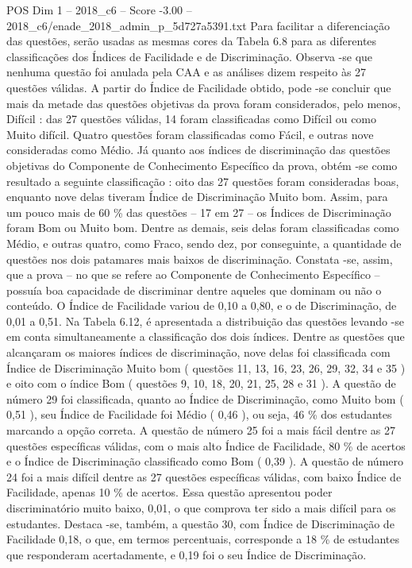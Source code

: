 \begin{textsample}{POS Dim 1 – 2018\_c6 – Score -3.00 – 2018\_c6/enade\_2018\_admin\_p\_5d727a5391.txt}
Para facilitar a diferenciação das questões, serão usadas as mesmas cores da Tabela 6.8 para as diferentes classificações dos Índices de Facilidade e de Discriminação.
Observa -se que nenhuma questão foi anulada pela CAA e as análises dizem respeito às 27 questões válidas.
A partir do Índice de Facilidade obtido, pode -se concluir que mais da metade das questões objetivas da prova foram considerados, pelo menos, Difícil : das 27 questões válidas, 14 foram classificadas como Difícil ou como Muito difícil.
Quatro questões foram classificadas como Fácil, e outras nove consideradas como Médio.
Já quanto aos índices de discriminação das questões objetivas do Componente de Conhecimento Específico da prova, obtém -se como resultado a seguinte classificação : oito das 27 questões foram consideradas boas, enquanto nove delas tiveram Índice de Discriminação Muito bom.
Assim, para um pouco mais de 60 \% das questões – 17 em 27 – os Índices de Discriminação foram Bom ou Muito bom.
Dentre as demais, seis delas foram classificadas como Médio, e outras quatro, como Fraco, sendo dez, por conseguinte, a quantidade de questões nos dois patamares mais baixos de discriminação.
Constata -se, assim, que a prova – no que se refere ao Componente de Conhecimento Específico – possuía boa capacidade de discriminar dentre aqueles que dominam ou não o conteúdo.
O Índice de Facilidade variou de 0,10 a 0,80, e o de Discriminação, de 0,01 a 0,51.
Na Tabela 6.12, é apresentada a distribuição das questões levando -se em conta simultaneamente a classificação dos dois índices.
Dentre as questões que alcançaram os maiores índices de discriminação, nove delas foi classificada com Índice de Discriminação Muito bom ( questões 11, 13, 16, 23, 26, 29, 32, 34 e 35 ) e oito com o índice Bom ( questões 9, 10, 18, 20, 21, 25, 28 e 31 ).
A questão de número 29 foi classificada, quanto ao Índice de Discriminação, como Muito bom ( 0,51 ), seu Índice de Facilidade foi Médio ( 0,46 ), ou seja, 46 \% dos estudantes marcando a opção correta.
A questão de número 25 foi a mais fácil dentre as 27 questões específicas válidas, com o mais alto Índice de Facilidade, 80 \% de acertos e o Índice de Discriminação classificado como Bom ( 0,39 ).
A questão de número 24 foi a mais difícil dentre as 27 questões específicas válidas, com baixo Índice de Facilidade, apenas 10 \% de acertos.
Essa questão apresentou poder discriminatório muito baixo, 0,01, o que comprova ter sido a mais difícil para os estudantes.
Destaca -se, também, a questão 30, com Índice de Discriminação de Facilidade 0,18, o que, em termos percentuais, corresponde a 18 \% de estudantes que responderam acertadamente, e 0,19 foi o seu Índice de Discriminação.

\end{textsample}
